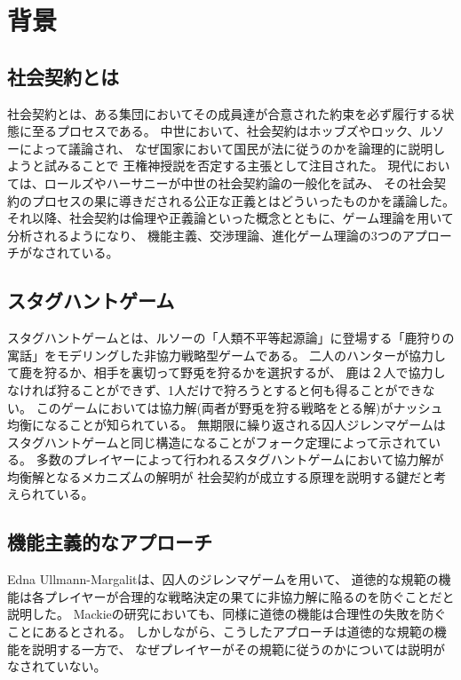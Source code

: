 \chapter{背景}
\section{社会契約とは}
社会契約とは、ある集団においてその成員達が合意された約束を必ず履行する状態に至るプロセスである。
中世において、社会契約はホッブズやロック、ルソーによって議論され、
なぜ国家において国民が法に従うのかを論理的に説明しようと試みることで
王権神授説を否定する主張として注目された。
現代においては、ロールズやハーサニーが中世の社会契約論の一般化を試み、
その社会契約のプロセスの果に導きだされる公正な正義とはどういったものかを議論した。
それ以降、社会契約は倫理や正義論といった概念とともに、ゲーム理論を用いて分析されるようになり、
機能主義、交渉理論、進化ゲーム理論の3つのアプローチがなされている。\cite{sep-game-ethics}

\section{スタグハントゲーム}

スタグハントゲームとは、ルソーの「人類不平等起源論」\cite{rousseau1999discourse}に登場する「鹿狩りの寓話」をモデリングした非協力戦略型ゲームである。\cite{skyrms2001}
二人のハンターが協力して鹿を狩るか、相手を裏切って野兎を狩るかを選択するが、
鹿は２人で協力しなければ狩ることができず、1人だけで狩ろうとすると何も得ることができない。
このゲームにおいては協力解(両者が野兎を狩る戦略をとる解)がナッシュ均衡になることが知られている。
無期限に繰り返される囚人ジレンマゲームはスタグハントゲームと同じ構造になることがフォーク定理によって示されている。
多数のプレイヤーによって行われるスタグハントゲームにおいて協力解が均衡解となるメカニズムの解明が
社会契約が成立する原理を説明する鍵だと考えられている。\cite{skyrms2001}

\section{機能主義的なアプローチ}
Edna Ullmann-Margalitは、囚人のジレンマゲームを用いて、
道徳的な規範の機能は各プレイヤーが合理的な戦略決定の果てに非協力解に陥るのを防ぐことだと説明した。\cite{edna1977}
Mackieの研究においても、同様に道徳の機能は合理性の失敗を防ぐことにあるとされる。\cite{machie1977ethics}
しかしながら、こうしたアプローチは道徳的な規範の機能を説明する一方で、
なぜプレイヤーがその規範に従うのかについては説明がなされていない。

